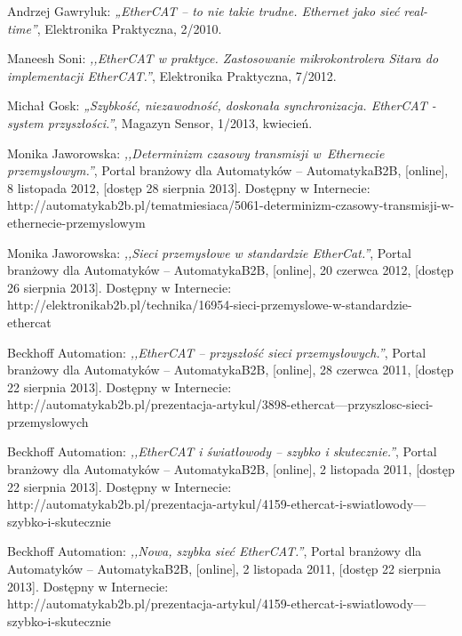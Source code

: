 \begin{thebibliography}{99}
Andrzej Gawryluk:
\emph{„EtherCAT – to nie takie trudne. Ethernet jako sieć real-time”},
Elektronika Praktyczna, 2/2010.

Maneesh Soni:
\emph{,,EtherCAT w praktyce. Zastosowanie mikrokontrolera Sitara do implementacji EtherCAT.''},
Elektronika Praktyczna, 7/2012.

Michał Gosk:
\emph{„Szybkość, niezawodność, doskonała synchronizacja. EtherCAT - system przyszłości.”},
Magazyn Sensor, 1/2013, kwiecień.

Monika Jaworowska:
\emph{,,Determinizm czasowy transmisji w~Ethernecie przemysłowym.''},
Portal branżowy dla Automatyków -- AutomatykaB2B, 
[online],
8 listopada 2012,
[dostęp 28 sierpnia 2013].
Dostępny w Internecie: \\
http://automatykab2b.pl/tematmiesiaca/5061-determinizm-czasowy-transmisji-w-ethernecie-przemyslowym

Monika Jaworowska:
\emph{,,Sieci przemysłowe w standardzie EtherCat.''},
Portal branżowy dla Automatyków -- AutomatykaB2B, 
[online],
20 czerwca 2012,
[dostęp 26 sierpnia 2013].
Dostępny w Internecie: \\
http://elektronikab2b.pl/technika/16954-sieci-przemyslowe-w-standardzie-ethercat

Beckhoff Automation:
\emph{,,EtherCAT -- przyszłość sieci przemysłowych.''},
Portal branżowy dla Automatyków -- AutomatykaB2B, 
[online],
28 czerwca 2011,
[dostęp 22 sierpnia 2013].
Dostępny w Internecie: \\
http://automatykab2b.pl/prezentacja-artykul/3898-ethercat---przyszlosc-sieci-przemyslowych

Beckhoff Automation:
\emph{,,EtherCAT i światłowody -- szybko i skutecznie.''},
Portal branżowy dla Automatyków -- AutomatykaB2B, 
[online],
2 listopada 2011,
[dostęp 22 sierpnia 2013].
Dostępny w Internecie: \\
http://automatykab2b.pl/prezentacja-artykul/4159-ethercat-i-swiatlowody---szybko-i-skutecznie

Beckhoff Automation:
\emph{,,Nowa, szybka sieć EtherCAT.''},
Portal branżowy dla Automatyków -- AutomatykaB2B, 
[online],
2 listopada 2011,
[dostęp 22 sierpnia 2013].
Dostępny w Internecie: \\
http://automatykab2b.pl/prezentacja-artykul/4159-ethercat-i-swiatlowody---szybko-i-skutecznie


\end{thebibliography}
